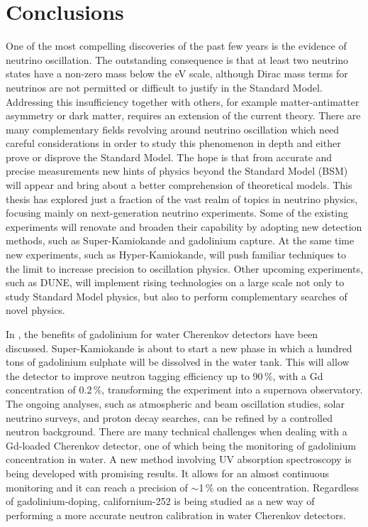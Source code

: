 \clearpage
\chapter{Conclusions}
\label{sec:conclusions}

One of the most compelling discoveries of the past few years is the evidence of neutrino oscillation.
The outstanding consequence is that at least two neutrino states have %
a non-zero mass below the eV scale, although Dirac mass terms for neutrinos are not permitted or difficult to justify %
in the Standard Model.
Addressing this insufficiency together with others, for example matter-antimatter asymmetry or dark matter, %
requires an extension of the current theory.
There are many complementary fields revolving around neutrino oscillation %
which need careful considerations in order to study this phenomenon in depth and either prove or disprove the Standard Model.
The hope is that from accurate and precise measurements new hints of physics beyond the Standard Model (BSM) will appear %
and bring about a better comprehension of theoretical models.
This thesis has explored just a fraction of the vast realm of topics in neutrino physics, %
focusing mainly on next-generation neutrino experiments.
Some of the existing experiments will renovate and broaden their capability %
by adopting new detection methods, such as Super-Kamiokande and gadolinium capture.
At the same time new experiments, such as Hyper-Kamiokande, will %
push familiar techniques to the limit to increase precision to oscillation physics.
Other upcoming experiments, such as DUNE, will implement rising technologies on a large scale %
not only to study Standard Model physics, but also to perform complementary searches of novel physics.

In , the benefits of gadolinium for water Cherenkov detectors have been discussed.
Super-Kamiokande is about to start a new phase in which a hundred tons of gadolinium sulphate %
will be dissolved in the water tank.
This will allow the detector to improve neutron tagging efficiency up to 90\,\%, with a Gd concentration of 0.2\,\%, %
transforming the experiment into a supernova observatory.
The ongoing analyses, such as atmospheric and beam oscillation studies, solar neutrino surveys, and proton decay searches, %
can be refined by a controlled neutron background.
There are many technical challenges when dealing with a Gd-loaded Cherenkov detector, %
one of which being the monitoring of gadolinium concentration in water.
A new method involving UV absorption spectroscopy is being developed with promising results.
It allows for an almost continuous monitoring and it can reach a precision of $\sim$1\,\% on the concentration.
Regardless of gadolinium-doping, californium-252 is being studied as a new way of %
performing a more accurate neutron calibration in water Cherenkov detectors.


